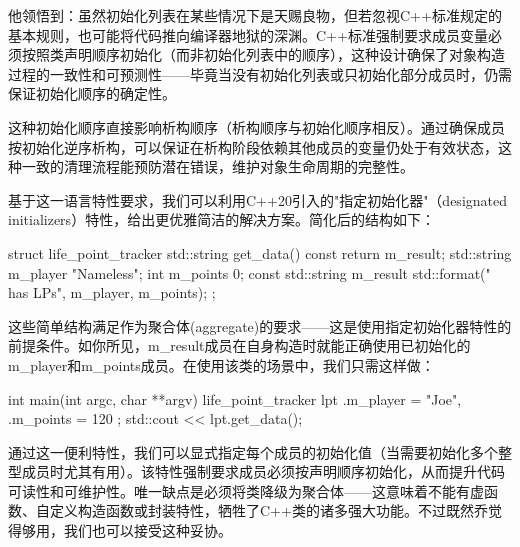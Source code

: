 他领悟到：虽然初始化列表在某些情况下是天赐良物，但若忽视C++标准规定的基本规则，也可能将代码推向编译器地狱的深渊。C++标准强制要求成员变量必须按照类声明顺序初始化（而非初始化列表中的顺序），这种设计确保了对象构造过程的一致性和可预测性——毕竟当没有初始化列表或只初始化部分成员时，仍需保证初始化顺序的确定性。

这种初始化顺序直接影响析构顺序（析构顺序与初始化顺序相反）。通过确保成员按初始化逆序析构，可以保证在析构阶段依赖其他成员的变量仍处于有效状态，这种一致的清理流程能预防潜在错误，维护对象生命周期的完整性。

基于这一语言特性要求，我们可以利用C++20引入的"指定初始化器"（designated initializers）特性，给出更优雅简洁的解决方案。简化后的结构如下：

\begin{cpp}
struct life_point_tracker {
  std::string get_data() const {
  return m_result;
  }
  std::string m_player {"Nameless"};
  int m_points {0};
  const std::string m_result
    {std::format("{} has {} LPs", m_player, m_points)};
};
\end{cpp}

这些简单结构满足作为聚合体(aggregate)的要求——这是使用指定初始化器特性的前提条件。如你所见，m\_result成员在自身构造时就能正确使用已初始化的m\_player和m\_points成员。在使用该类的场景中，我们只需这样做：

\begin{cpp}
int main(int argc, char **argv) {
  life_point_tracker lpt {
    .m_player = "Joe",
    .m_points = 120
  };
  std::cout << lpt.get_data();
}
\end{cpp}

通过这一便利特性，我们可以显式指定每个成员的初始化值（当需要初始化多个整型成员时尤其有用）。该特性强制要求成员必须按声明顺序初始化，从而提升代码可读性和可维护性。唯一缺点是必须将类降级为聚合体——这意味着不能有虚函数、自定义构造函数或封装特性，牺牲了C++类的诸多强大功能。不过既然乔觉得够用，我们也可以接受这种妥协。


